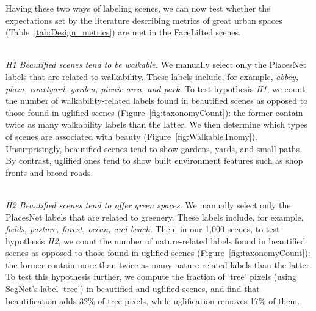 Having these two ways of labeling scenes, we can now test whether the expectations set by the literature describing metrics of great urban spaces (Table~\ref{tab:Design_metrics}) are  met in the FaceLifted scenes. 


\mbox{ } \\
\noindent
\emph{H1 Beautified scenes tend to be walkable.}
We manually select only the PlacesNet labels that are related to walkability. These labels include, for example, \textit{abbey, plaza, courtyard, garden, picnic area, \textrm{and} park}. To test hypothesis \emph{H1}, we count the number of walkability-related labels found in beautified scenes as opposed to those found in uglified scenes (Figure~\ref{fig:taxonomyCount}): the former contain twice as many walkability labels than the latter. We then determine which types of scenes are associated with beauty (Figure~\ref{fig:WalkableTnomy}). Unsurprisingly, beautified scenes tend to show gardens, yards, and small paths. By contrast, uglified ones tend to show built environment features such as shop fronts and broad roads. 


\mbox{ } \\
\noindent
\emph{H2 Beautified scenes tend to offer green spaces.}
We manually select only the PlacesNet labels that are related to greenery. These labels include, for example, \textit{fields, pasture, forest, ocean, and beach}. Then, in our 1,000 scenes, to test hypothesis \emph{H2}, we count the number of nature-related labels found in beautified scenes as opposed to those found in uglified scenes (Figure~\ref{fig:taxonomyCount}): the former contain more than twice as many nature-related labels than the latter.  To test this hypothesis further, we compute the fraction of `tree' pixels (using SegNet's label `tree') in beautified and uglified scenes, and  find that beautification adds  32\% of tree pixels, while uglification removes 17\% of them. 


